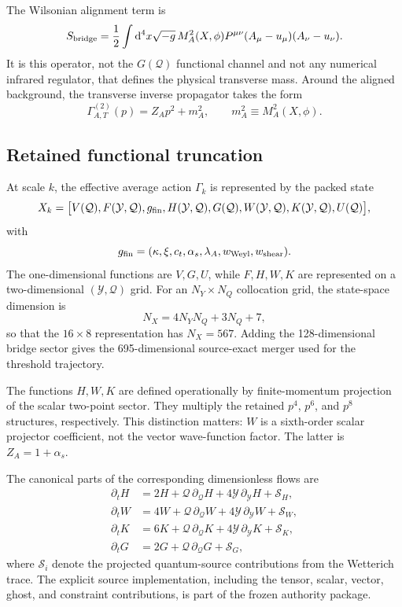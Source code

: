 \documentclass[12pt]{iopart}
\newcommand{\dd}{\mathrm{d}}
\newcommand{\cS}{\mathcal S}
\newcommand{\Q}{\mathcal Q}
\newcommand{\Y}{\mathcal Y}
\begin{document}
The Wilsonian alignment term is
\begin{equation}
S_{\rm bridge}=\frac12\int\dd^4x\sqrt{-g}\,
M_A^2(X,\phi)P^{\mu\nu}(A_\mu-u_\mu)(A_\nu-u_\nu).
\label{eq:bridge}
\end{equation}
It is this operator, not the $G(\Q)$ functional channel and not any numerical infrared regulator, that defines the physical transverse mass.  Around the aligned background, the transverse inverse propagator takes the form
\begin{equation}
\Gamma^{(2)}_{A,T}(p)=Z_Ap^2+m_A^2,
\qquad m_A^2\equiv M_A^2(X,\phi).
\label{eq:vectorprop}
\end{equation}

\subsection{Retained functional truncation}

At scale $k$, the effective average action $\Gamma_k$ is represented by the packed state
\begin{equation}
X_k=\big[V(\Q),F(\Y,\Q),g_{\rm fin},H(\Y,\Q),G(\Q),W(\Y,\Q),K(\Y,\Q),U(\Q)\big],
\label{eq:packed}
\end{equation}
with
\begin{equation}
g_{\rm fin}=(\kappa,\xi,c_t,\alpha_s,\lambda_A,w_{\rm Weyl},w_{\rm shear}).
\end{equation}
The one-dimensional functions are $V,G,U$, while $F,H,W,K$ are represented on a two-dimensional $(\Y,\Q)$ grid.  For an $N_Y\times N_Q$ collocation grid, the state-space dimension is
\begin{equation}
N_X=4N_YN_Q+3N_Q+7,
\label{eq:dim}
\end{equation}
so that the $16\times8$ representation has $N_X=567$.  Adding the 128-dimensional bridge sector gives the 695-dimensional source-exact merger used for the threshold trajectory.

The functions $H,W,K$ are defined operationally by finite-momentum projection of the scalar two-point sector.  They multiply the retained $p^4$, $p^6$, and $p^8$ structures, respectively.  This distinction matters: $W$ is a sixth-order scalar projector coefficient, not the vector wave-function factor.  The latter is $Z_A=1+\alpha_s$.

The canonical parts of the corresponding dimensionless flows are
\begin{align}
\partial_t H &=2H+\Q\,\partial_\Q H+4\Y\,\partial_\Y H+\cS_H,\\
\partial_t W &=4W+\Q\,\partial_\Q W+4\Y\,\partial_\Y W+\cS_W,\\
\partial_t K &=6K+\Q\,\partial_\Q K+4\Y\,\partial_\Y K+\cS_K,\\
\partial_t G &=2G+\Q\,\partial_\Q G+\cS_G,
\label{eq:canonicalflows}
\end{align}
where $\cS_i$ denote the projected quantum-source contributions from the Wetterich trace.  The explicit source implementation, including the tensor, scalar, vector, ghost, and constraint contributions, is part of the frozen authority package.
\end{document}
